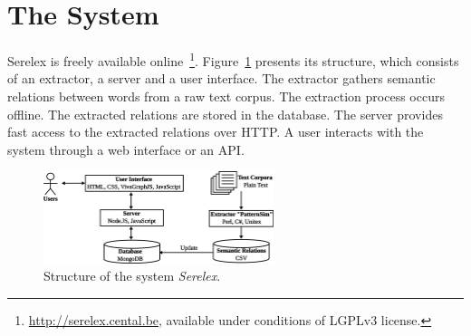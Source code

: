 \documentclass[runningheads,a4paper]{llncs}
\begin{document}





\section{The System}

Serelex is freely available online~\footnote{ \url{http://serelex.cental.be}, available under conditions of LGPLv3 license.}. Figure~\ref{fig:architecture} presents its structure, which consists of an extractor, a server and a user interface. The extractor gathers semantic relations between words from a raw text corpus. The extraction process occurs offline. The extracted relations are stored in the database. The server provides fast access to the extracted relations over HTTP. A user interacts with the system through a web interface or an API. %


\begin{figure}
	\centering
		\includegraphics[width=0.60\textwidth]{figures/arch2} 
		\caption{Structure of the system \textit{Serelex}.}
			\label{fig:architecture}
\end{figure}
\end{document}

